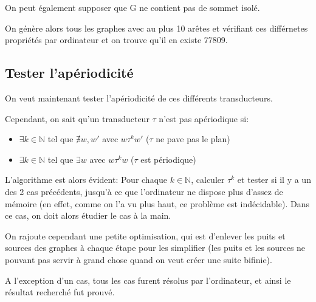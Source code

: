 \documentclass{scrartcl}
\newcommand{\N}{\mathbb N}
\theoremstyle{definition}
\theoremstyle{remark}
\begin{document}
On peut également supposer que G ne contient pas de sommet isolé.

On génère alors tous les graphes avec au plus 10 arêtes et vérifiant ces différnetes propriétés par ordinateur
et on trouve qu'il en existe 77809.

\subsection{Tester l'apériodicité}

On veut maintenant tester l'apériodicité de ces différents transducteurs.

Cependant, on sait qu'un transducteur $\tau$ n'est pas apériodique si:

\begin{itemize}
    \item $\exists k \in \N$ tel que $\nexists w,w'$ avec $w \tau^k w'$ ($\tau$ ne pave pas le plan)
    \item $\exists k \in \N$ tel que $\exists w$ avec $w \tau^k w$ ($\tau$ est périodique)
\end{itemize}

L'algorithme est alors évident: Pour chaque $k \in \N$, calculer $\tau^k$ et tester si il y a un des 2 cas précédents,
jusqu'à ce que l'ordinateur ne dispose plus d'assez de mémoire (en effet, comme on l'a vu plus haut, ce problème est indécidable).
Dans ce cas, on doit alors étudier le cas à la main.

On rajoute cependant une petite optimisation, qui est d'enlever les puits et sources des graphes à chaque étape pour les simplifier
(les puits et les sources ne pouvant pas servir à grand chose quand on veut créer une suite bifinie).

A l'exception d'un cas, tous les cas furent résolus par l'ordinateur, et ainsi le résultat recherché fut prouvé.
\end{document}
